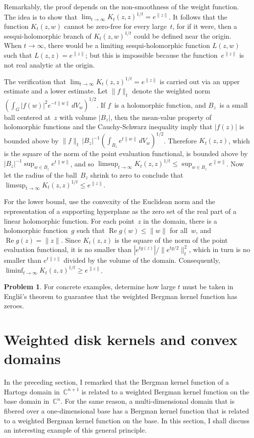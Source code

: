 \documentclass[12pt]{amsart}
\theoremstyle{definition}
\newtheorem{problem}{Problem}
\newcommand{\C}{\mathbb{C}}
\DeclareMathOperator{\re}{Re}
\begin{document}
Remarkably, the proof depends on the non-smoothness of the weight
function.  The idea is to show that
\(\lim_{t\to\infty}K_t(z,z)^{1/t}=e^{\|z\|}\). It follows that
the function \(K_t(z,w)\) cannot be zero-free for every
large~$t$, for if it were, then a sesqui-holomorphic branch of
\(K_t(z,w)^{1/t}\) could be defined near the origin.  When
\(t\to\infty\), there would be a limiting sesqui-holomorphic
function \(L(z,w)\) such that \(L(z,z)=e^{\|z\|}\); but this is
impossible because the function~\(e^{\|z\|}\) is not real
analytic at the origin.

The verification that
\(\lim_{t\to\infty}K_t(z,z)^{1/t}=e^{\|z\|}\) is carried out via
an upper estimate and a lower estimate.  Let \(\|f\|_t\) denote
the weighted norm \((\int_G |f(w)|^2 e^{-t\|w\|}\, dV_w)^{1/2}\).
If \(f\)~is a holomorphic function, and \(B_z\)~is a small ball
centered at~\(z\) with volume \(|B_z|\), then the mean-value
property of holomorphic functions and the Cauchy-Schwarz
inequality imply that \(|f(z)|\) is bounded above by \(\|f\|_{t}
\,|B_z|^{-1} (\int_{B_z} e^{t\|w\|}\, dV_w)^{1/2}\). Therefore
\(K_t(z,z)\), which is the square of the norm of the point
evaluation functional, is bounded above by \(|B_z|^{-1}
\sup_{w\in B_z} e^{t\|w\|}\), and so \(\limsup_{t\to \infty}
K_t(z,z)^{1/t} \le \sup_{w\in B_z} e^{\|w\|}\). Now let the
radius of the ball~\(B_z\) shrink to zero to conclude that
\(\limsup_{t\to \infty} K_t(z,z)^{1/t} \le e^{\|z\|}\).

For the lower bound, use the convexity of the Euclidean norm and
the representation of a supporting hyperplane as the zero set of
the real part of a linear holomorphic function. For each
point~\(z\) in the domain, there is a holomorphic function~\(g\)
such that \(\re g(w)\le\|w\|\) for all~\(w\), and \(\re
g(z)=\|z\|\).  Since \(K_t(z,z)\) is the square of the norm of
the point evaluation functional, it is no smaller than
\(|e^{tg(z)}|/\|e^{tg/2}\|_t^2\), which in turn is no smaller
than \(e^{t\|z\|}\) divided by the volume of the domain.
Consequently, \(\liminf_{t\to\infty} K_t(z,z)^{1/t}\ge
e^{\|z\|}\).

  \begin{problem}
    For concrete examples, determine how large \(t\) must be
    taken in Engli{\v{s}}'s theorem to guarantee that the
    weighted Bergman kernel function has zeroes.
  \end{problem}

\section{Weighted disk kernels and convex domains}
In the preceding section, I remarked that the Bergman kernel
function of a Hartogs domain in~\(\C^{n+1}\) is related to a
weighted Bergman kernel function on the base domain in~\(\C^n\).
For the same reason, a multi-dimensional domain that is fibered
over a one-dimensional base has a Bergman kernel function that is
related to a weighted Bergman kernel function on the base.  In
this section, I shall discuss an interesting example of this
general principle.
\end{document}
